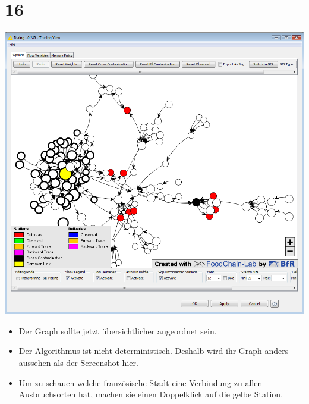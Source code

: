 \documentclass{beamer}
\begin{document}
\section{16}
\begin{frame}
	\begin{center}
  		\includegraphics[height=0.6\textheight]{16.png}
	\end{center}
	\begin{itemize}
		\item Der Graph sollte jetzt übersichtlicher angeordnet sein.
		\item Der Algorithmus ist nicht deterministisch. Deshalb wird ihr Graph anders aussehen als der Screenshot hier.
		\item Um zu schauen welche französische Stadt eine Verbindung zu allen Ausbruchsorten hat, machen sie einen Doppelklick auf die gelbe Station.
	\end{itemize}
\end{frame}
\end{document}
